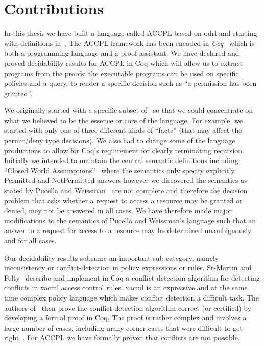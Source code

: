 \section{Contributions}\label{sec:contribs}

In this thesis we have built a language called \ac{ACCPL} based on \ac{odrl} and starting with definitions in~\cite{pucella2006}. The \ac{ACCPL} framework has been encoded in \emph{Coq}~\cite{BC04} which is both a programming language and a proof-assistant. We have declared and proved decidability results for \ac{ACCPL} in Coq which will allow us to extract programs from the proofs; the executable programs can be used on specific policies and a query, to render a specific decision such as ``a permission has been granted''. 

We originally started with a specific subset of~\cite{pucella2006} so that we could concentrate on what we believed to be the essence or core of the language. For example, we started with only one of three different kinds of ``facts'' (that may affect the permit/deny type decisions). We also had to change some of the language productions to allow for Coq's requirement for clearly terminating recursion. Initially we intended to maintain the central semantic definitions including ``Closed World Assumptions''~\cite{pucella2006} where the semantics only specify explicitly Permitted and NotPermitted answers however we discovered the semantics as stated by Pucella and Weissman~\cite{pucella2006} are not complete and therefore the decision problem that asks whether a request to access a resource may be granted or denied, may not be answered in all cases. We have therefore made major modifications to the semantics of Pucella and Weissman's language such that an answer to a request for access to a resource may be determined unambiguously and for all cases. 
    
Our decidability results subsume an important sub-category, namely inconsistency or conflict-detection in policy expressions or rules. St-Martin and Felty~\cite{felty16} describe and implement in Coq a conflict detection algorithm for detecting conflicts in \ac{xacml} access control rules. \ac{xacml} is an expressive and at the same time complex policy language which makes conflict detection a difficult task. The authors of~\cite{felty16} then prove the conflict detection algorithm correct (or certified) by developing a formal proof in Coq. The proof is rather complex and involves a large number of cases, including many corner cases that were difficult to get right~\cite{felty16}. For \ac{ACCPL} we have formally proven that conflicts are not possible.

